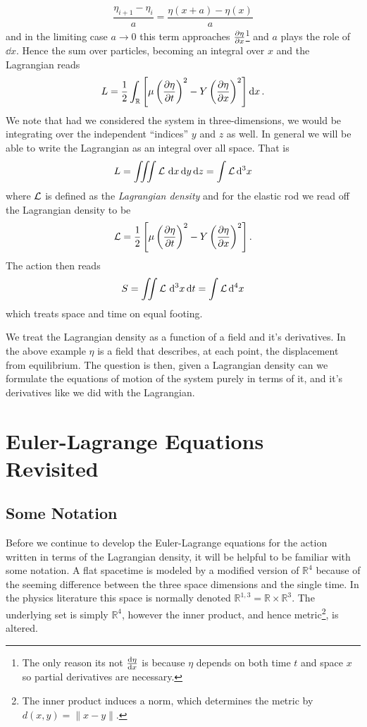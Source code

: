 \begin{equation}
\frac{\eta_{i + 1} - \eta_i}{a} = \frac{\eta(x + a) - \eta(x)}{a}
\end{equation}
and in the limiting case $a\to 0$ this term approaches $\pdv{\eta}{x}$\footnote{The only reason its not $\dv{\eta}{x}$ is because $\eta$ depends on both time $t$ and space $x$ so partial derivatives are necessary.} and $a$ plays the role of $\dd{x}$. Hence the sum over particles, becoming an integral over $x$ and the Lagrangian reads
\begin{equation}\label{eq:contLag}
L = \frac{1}{2}\int_\mathbb{R}\left[\mu\left(\pdv{\eta}{t}\right)^2 - Y\left(\pdv{\eta}{x}\right)^2\right]\dd{x}.
\end{equation}
We note that had we considered the system in three-dimensions, we would be integrating over the independent ``indices'' $y$ and $z$ as well. In general we will be able to write the Lagrangian as an integral over all space. That is
\begin{equation}\label{eq:lagDens}
L = \iiint\mathcal{L}\,\dd{x}\dd{y}\dd{z} = \int\mathcal{L} \dd[3]{x}
\end{equation}
where $\mathcal{L}$ is defined as the \textit{Lagrangian density} and for the elastic rod we read off the Lagrangian density to be
\begin{equation}
\mathcal{L} = \frac{1}{2}\left[\mu\left(\pdv{\eta}{t}\right)^2 - Y\left(\pdv{\eta}{x}\right)^2\right].
\end{equation}
The action then reads
\begin{equation}
S = \iint\mathcal{L}\,\dd[3]{x}\dd{t} = \int\mathcal{L}\dd[4]{x}
\end{equation}
which treats space and time on equal footing.

We treat the Lagrangian density as a function of a field and it's derivatives. In the above example $\eta$ is a field that describes, at each point, the displacement from equilibrium. The question is then, given a Lagrangian density can we formulate the equations of motion of the system purely in terms of it, and it's derivatives like we did with the Lagrangian.  

\section{Euler-Lagrange Equations Revisited}

\subsection{Some Notation}\label{sec:notation}
Before we continue to develop the Euler-Lagrange equations for the action written in terms of the Lagrangian density, it will be helpful to be familiar with some notation. A flat spacetime is modeled by a modified version of $\mathbb{R}^4$ because of the seeming difference between the three space dimensions and the single time. In the physics literature this space is normally denoted $\mathbb{R}^{1,3} = \mathbb{R}\times\mathbb{R}^3$. The underlying set is simply $\mathbb{R}^4$, however the inner product, and hence metric\footnote{The inner product induces a norm, which determines the metric by $d(x,y) = \|x - y\|$.}, is altered.

